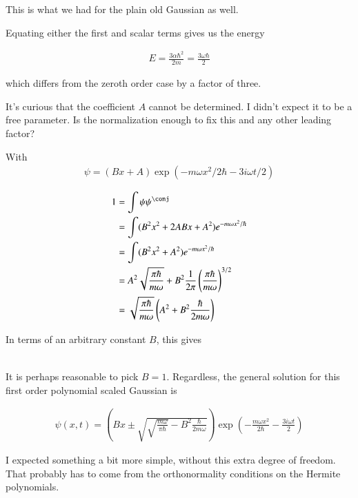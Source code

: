 This is what we had for the plain old Gaussian as well.

Equating either the first and scalar terms gives us the energy 

\begin{align*}
E = \frac{3 \alpha \hbar^2}{2m} = \frac{3 \omega \hbar}{2}
\end{align*}

which differs from the zeroth order case by a factor of three.

It's curious that the coefficient $A$ cannot be determined.  I didn't expect it to be a free parameter.  Is the normalization enough to
fix this and any other leading factor?

With
\begin{align*}
\psi = (B x + A) \exp( - m \omega x^2/2 \hbar - 3 i \omega t / 2 )
\end{align*}

\begin{align*}
1 
&= \int \psi\psi^\conj \\
&= \int (B^2 x^2 + 2 A B x + A^2 ) e^{- m \omega x^2/ \hbar } \\
&= \int (B^2 x^2 + A^2 ) e^{- m \omega x^2/ \hbar } \\
&= A^2 \sqrt{\frac{\pi \hbar}{m \omega}} + B^2 \inv{2 \pi} \left( \frac{\pi \hbar}{ m \omega} \right)^{3/2} \\
&= \sqrt{\frac{\pi \hbar}{m \omega}} \left( A^2 + B^2 \frac{ \hbar}{ 2 m \omega} \right) \\
\end{align*}

In terms of an arbitrary constant $B$, this gives

\begin{align*}
\end{align*}

It is perhaps reasonable to pick $B=1$.  Regardless, the general solution for this first order polynomial scaled Gaussian is

\begin{align*}
\psi(x,t) = 
\left(B x \pm \sqrt{\sqrt{\frac{m \omega}{\pi \hbar}} - B^2 \frac{ \hbar}{ 2 m \omega} }\right) \exp\left( - \frac{m \omega x^2}{2 \hbar} - \frac{3 i \omega t }{ 2} \right)
\end{align*}

I expected something a bit more simple, without this extra degree of freedom.  That probably has to come from the orthonormality conditions on the
Hermite polynomials.

